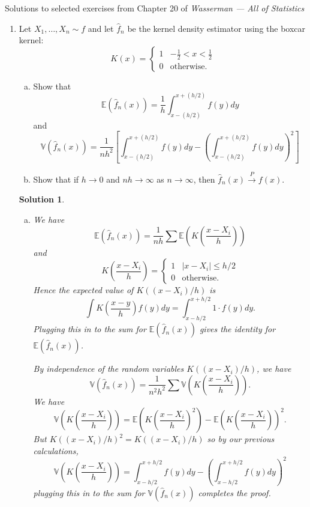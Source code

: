 \documentclass[10pt]{article}
\newtheorem*{sol}{Solution}
\newcommand{\V}{\mathbb{V}}
\newcommand{\E}{\mathbb{E}}
\begin{document}
\noindent \large{Solutions to selected exercises from Chapter 20 of
\emph{Wasserman --- All of Statistics}}

\begin{enumerate}

\item[(1)]
Let $X_1,\ldots,X_n\sim f$ and let $\hat f_n$ be the kernel density
estimator using the boxcar kernel:
\[
K(x) = \begin{cases}
1 & -\frac{1}{2} < x < \frac{1}{2} \\
0 & \text{otherwise.}
\end{cases}
\]

\begin{enumerate}[(a)]
\item Show that
\[
\E(\hat f_n(x)) = \frac{1}{h}\int_{x-(h/2)}^{x+(h/2)}f(y)dy
\]
and
\[
\V(\hat f_n(x)) = \frac{1}{nh^2}\left[ \int_{x-(h/2)}^{x+(h/2)} f(y)dy -
\left(\int_{x-(h/2)}^{x+(h/2)}f(y)dy\right)^2\right]
\]

\item Show that if $h\to 0$ and $nh\to\infty$ as $n\to\infty$,
then $\hat f_n(x)\xrightarrow{P} f(x)$.
\end{enumerate}

\begin{sol}
\begin{enumerate}[(a)]
\item We have
\[
\E(\hat f_n(x)) = \frac{1}{nh}\sum \E\left(K\left(\frac{x-X_i}{h}\right)\right)
\]
and
\[
K\left(\frac{x-X_i}{h}\right) =
\begin{cases}
1 & |x-X_i| \leq h/2 \\
0 & \text{otherwise}.
\end{cases}
\]
Hence the expected value of $K((x-X_i)/h)$ is
\[
\int K\left(\frac{x-y}{h}\right)f(y)dy = \int_{x-h/2}^{x+h/2} 1 \cdot f(y)dy.
\]
Plugging this in to the sum for $\E(\hat f_n(x))$ gives the identity for
$\E(\hat f_n(x))$.

By independence of the random variables $K((x-X_i)/h)$, we have
\[
\V(\hat f_n(x)) = \frac{1}{n^2h^2}\sum \V\left(K\left(\frac{x-X_i}{h}\right)\right).
\]
We have
\[
\V\left(K\left(\frac{x-X_i}{h}\right)\right) =
\E\left(K\left(\frac{x-X_i}{h}\right)^2\right) -
\E\left(K\left(\frac{x-X_i}{h}\right)\right)^2.
\]
But $K((x-X_i)/h)^2=K((x-X_i)/h)$ so by our previous calculations,
\[
\V\left(K\left(\frac{x-X_i}{h}\right)\right)
=
\int_{x-h/2}^{x+h/2}f(y)dy - \left(\int_{x-h/2}^{x+h/2}f(y)dy\right)^2
\]
plugging this in to the sum for $\V(\hat f_n(x))$ completes the proof.


\end{enumerate}
\end{sol}
\end{enumerate}
\end{document}
